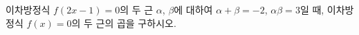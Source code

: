 이차방정식 $f(2x-1)=0$의 두 근 $\alpha$, $\beta$에 대하여 $\alpha+\beta=-2$, $\alpha\beta=3$일 때, 이차방정식 $f(x)=0$의 두 근의 곱을 구하시오.
